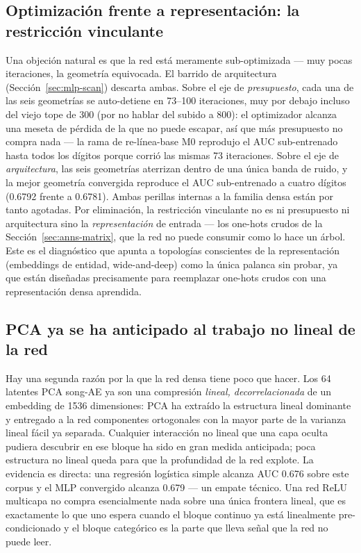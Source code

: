 \documentclass[11pt]{article}
\begin{document}
\subsection{Optimización frente a representación: la restricción vinculante}
\label{sec:anns-binding}
Una objeción natural es que la red está meramente sub-optimizada --- muy pocas
iteraciones, la geometría equivocada. El barrido de arquitectura
(Sección~\ref{sec:mlp-scan}) descarta ambas. Sobre el eje de \emph{presupuesto},
cada una de las seis geometrías se auto-detiene en 73--100 iteraciones, muy por
debajo incluso del viejo tope de 300 (por no hablar del subido a 800): el
optimizador alcanza una meseta de pérdida de la que no puede escapar, así que más
presupuesto no compra nada --- la rama de re-línea-base M0 reprodujo el AUC
sub-entrenado hasta todos los dígitos porque corrió las mismas 73 iteraciones.
Sobre el eje de \emph{arquitectura}, las seis geometrías aterrizan dentro de una
única banda de ruido, y la mejor geometría convergida reproduce el AUC
sub-entrenado a cuatro dígitos (0.6792 frente a 0.6781). Ambas perillas internas
a la familia densa están por tanto agotadas. Por eliminación, la restricción
vinculante no es ni presupuesto ni arquitectura sino la \emph{representación} de
entrada --- los one-hots crudos de la Sección~\ref{sec:anns-matrix}, que la red no
puede consumir como lo hace un árbol. Este es el diagnóstico que apunta a
topologías conscientes de la representación (embeddings de entidad, wide-and-deep)
como la única palanca sin probar, ya que están diseñadas precisamente para
reemplazar one-hots crudos con una representación densa aprendida.

\subsection{PCA ya se ha anticipado al trabajo no lineal de la red}
\label{sec:anns-pca}
Hay una segunda razón por la que la red densa tiene poco que hacer. Los 64
latentes PCA song-AE ya son una compresión \emph{lineal, decorrelacionada} de un
embedding de 1536 dimensiones: PCA ha extraído la estructura lineal dominante y
entregado a la red componentes ortogonales con la mayor parte de la varianza
lineal fácil ya separada. Cualquier interacción no lineal que una capa oculta
pudiera descubrir en ese bloque ha sido en gran medida anticipada; poca
estructura no lineal queda para que la profundidad de la red explote. La evidencia
es directa: una regresión logística simple alcanza AUC 0.676 sobre este corpus y
el MLP convergido alcanza 0.679 --- un empate técnico. Una red ReLU multicapa no
compra esencialmente nada sobre una única frontera lineal, que es exactamente lo
que uno espera cuando el bloque continuo ya está linealmente pre-condicionado y el
bloque categórico es la parte que lleva señal que la red no puede leer.
\end{document}
